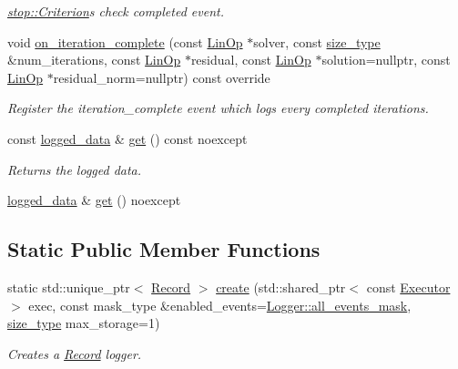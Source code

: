 \begin{DoxyCompactItemize}
\begin{DoxyCompactList}\small\item\em \hyperlink{classgko_1_1stop_1_1Criterion}{stop\+::\+Criterion}\textquotesingle{}s check completed event. \end{DoxyCompactList}\item 
void \hyperlink{classgko_1_1log_1_1Record_a98999c72a91fd2fc061b03a40ea1c3fd}{on\+\_\+iteration\+\_\+complete} (const \hyperlink{classgko_1_1LinOp}{Lin\+Op} $\ast$solver, const \hyperlink{namespacegko_a6e5c95df0ae4e47aab2f604a22d98ee7}{size\+\_\+type} \&num\+\_\+iterations, const \hyperlink{classgko_1_1LinOp}{Lin\+Op} $\ast$residual, const \hyperlink{classgko_1_1LinOp}{Lin\+Op} $\ast$solution=nullptr, const \hyperlink{classgko_1_1LinOp}{Lin\+Op} $\ast$residual\+\_\+norm=nullptr) const override
\begin{DoxyCompactList}\small\item\em Register the {\ttfamily iteration\+\_\+complete} event which logs every completed iterations. \end{DoxyCompactList}\item 
const \hyperlink{structgko_1_1log_1_1Record_1_1logged__data}{logged\+\_\+data} \& \hyperlink{classgko_1_1log_1_1Record_ae64de3b730322ec8be7353aba30899b2}{get} () const noexcept
\begin{DoxyCompactList}\small\item\em Returns the logged data. \end{DoxyCompactList}\item 
\hyperlink{structgko_1_1log_1_1Record_1_1logged__data}{logged\+\_\+data} \& \hyperlink{classgko_1_1log_1_1Record_a714affcca3269fed88b982e7db011184}{get} () noexcept
\end{DoxyCompactItemize}
\subsection*{Static Public Member Functions}
\begin{DoxyCompactItemize}
\item 
static std\+::unique\+\_\+ptr$<$ \hyperlink{classgko_1_1log_1_1Record}{Record} $>$ \hyperlink{classgko_1_1log_1_1Record_ab3863ff409b8ceaefa2f226a4e26debc}{create} (std\+::shared\+\_\+ptr$<$ const \hyperlink{classgko_1_1Executor}{Executor} $>$ exec, const mask\+\_\+type \&enabled\+\_\+events=\hyperlink{classgko_1_1log_1_1Logger_a02534863a2d2f92dfeb2c39038365532}{Logger\+::all\+\_\+events\+\_\+mask}, \hyperlink{namespacegko_a6e5c95df0ae4e47aab2f604a22d98ee7}{size\+\_\+type} max\+\_\+storage=1)
\begin{DoxyCompactList}\small\item\em Creates a \hyperlink{classgko_1_1log_1_1Record}{Record} logger. \end{DoxyCompactList}\end{DoxyCompactItemize}
